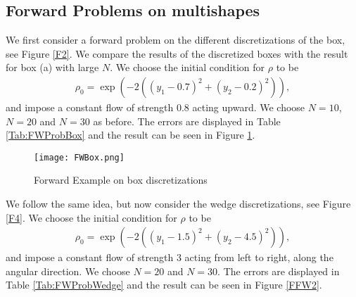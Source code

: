\subsection{Forward Problems on multishapes}
We first consider a forward problem on the different discretizations of the box, see Figure \ref{F2}. We compare the results of the discretized boxes with the result for box (a) with large $N$.
We choose the initial condition for $\rho$ to be
\begin{align*}
	\rho_0 = \exp(-2((y_1 - 0.7 )^2 + (y_2 - 0.2)^2)),
\end{align*}
and impose a constant flow of strength $0.8$ acting upward.
We choose $N = 10$, $N = 20$ and $N = 30$ as before. The errors are displayed in Table \ref{Tab:FWProbBox} and the result can be seen in Figure \ref{FFW1}. 
%
\begin{figure}[h]
	\centering
	\texttt{[image: FWBox.png]}
	\caption{Forward Example on box discretizations} 
	\label{FFW1}
\end{figure}


We follow the same idea, but now consider the wedge discretizations, see Figure \ref{F4}. We choose the initial condition for $\rho$ to be
\begin{align*}
	\rho_0 = \exp(-2((y_1 - 1.5 )^2 + (y_2 - 4.5)^2)),
\end{align*}
and impose a constant flow of strength $3$ acting from left to right, along the angular direction.
We choose $N = 20$ and $N = 30$. The errors are displayed in Table \ref{Tab:FWProbWedge} and the result can be seen in Figure \ref{FFW2}. 

